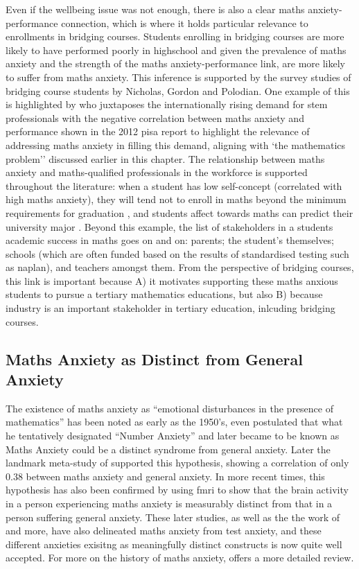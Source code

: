 \documentclass[twoside,12pt,a4paper]{report}
\begin{document}
Even if the wellbeing issue was not enough, there is also a clear maths anxiety-performance connection, which is where it holds particular relevance to enrollments in bridging courses. Students enrolling in bridging courses are more likely to have performed poorly in highschool and given the prevalence of maths anxiety and the strength of the maths anxiety-performance link, are more likely to suffer from maths anxiety. This inference is supported by the survey studies of bridging course students by Nicholas, Gordon and Polodian. One example of this is highlighted by  who juxtaposes the internationally rising demand for \gls{stem} professionals with the negative correlation between maths anxiety and performance shown in the 2012 \gls{pisa} report \cite{PISA2013} to highlight the relevance of addressing maths anxiety in filling this demand, aligning with `the mathematics problem'' discussed earlier in this chapter. The relationship between maths anxiety and maths-qualified professionals in the workforce is supported throughout the literature: when a student has low self-concept (correlated with high maths anxiety), they will tend not to enroll in maths beyond the minimum requirements for graduation \cite{Ashcraft2007book}, and students affect towards maths can predict their university major \cite{LeFevre1992}. Beyond this example, the list of stakeholders in a students academic success in maths goes on and on: parents; the student's themselves; schools (which are often funded based on the results of standardised testing such as \gls{naplan}), and teachers amongst them. From the perspective of bridging courses, this link is important because A) it motivates supporting these maths anxious students to pursue a tertiary mathematics educations, but also B) because industry is an important stakeholder in tertiary education, inlcuding bridging courses. 


\subsection*{Maths Anxiety as Distinct from General Anxiety}

The existence of maths anxiety as ``emotional disturbances in the presence of mathematics'' has been noted as early as the 1950's,  even postulated that what he tentatively designated ``Number Anxiety'' and later became to be known as Maths Anxiety could be a distinct syndrome from general anxiety. Later the landmark meta-study of  supported this hypothesis, showing a correlation of only $0.38$ between maths anxiety and general anxiety. In more recent times, this hypothesis has also been confirmed by  using \gls{fmri} to show that the brain activity in a person experiencing maths anxiety is measurably distinct from that in a person suffering general anxiety. These later studies, as well as the the work of  and more, have also delineated maths anxiety from test anxiety, and these different anxieties exisitng as meaningfully distinct constructs is now quite well accepted. For more on the history of maths anxiety,  offers a more detailed review.
\end{document}
